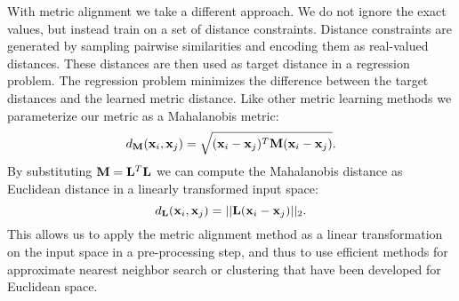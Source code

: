 
With metric alignment we take a different approach. We do not ignore the exact values, but instead train on a set of distance constraints. Distance constraints are generated by sampling pairwise similarities and encoding them as real-valued distances. These distances are then used as target distance in a regression problem. The regression problem minimizes the difference between the target distances and the learned metric distance. Like other metric learning methods we parameterize our metric as a Mahalanobis metric:  
\begin{equation}
d_{\mathbf{M}}(\mathbf{x}_i, \mathbf{x}_j) = \sqrt{(\mathbf{x}_i-\mathbf{x}_j)^T \mathbf{M} (\mathbf{x}_i - \mathbf{x}_j)}.
\label{eq:mahalanobis}
\end{equation}
By substituting $\mathbf{M} = \mathbf{L}^T \mathbf{L}$ we can compute the Mahalanobis distance as Euclidean distance in a linearly transformed input space:
\begin{equation}
d_{\mathbf{L}}(\mathbf{x}_i, \mathbf{x}_j) =  ||\mathbf{L} (\mathbf{x}_i - \mathbf{x}_j)||_2.
\label{eq:mahalanobis_transformation}
\end{equation}
This allows us to apply the metric alignment method as a linear transformation on the input space in a pre-processing step, and thus to use efficient methods for approximate nearest neighbor search or clustering that have been developed for Euclidean space. %


